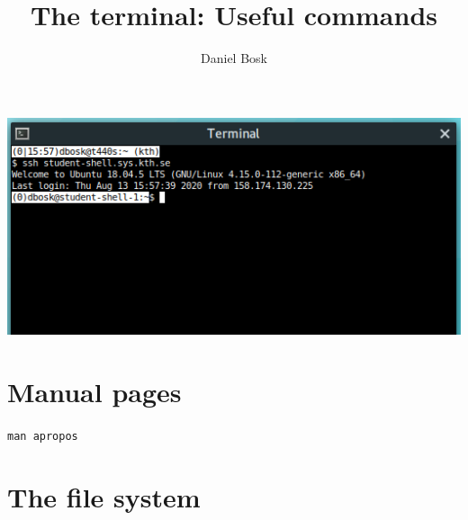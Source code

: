 \title{%
  The terminal: Useful commands
}
\author{Daniel Bosk}


\mode*


\begin{frame}
  \includegraphics[width=\columnwidth]{../../ssh/terminal.png}
\end{frame}


\section{Manual pages}

\begin{frame}[fragile]
  \begin{center}
    \LARGE
    \lstinline[basicstyle=\LARGE]{man apropos}
  \end{center}
\end{frame}


\section{The file system}

